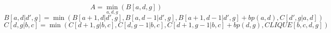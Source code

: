 \documentclass{article}
\begin{document}
$$ A =\min_{ a,d,g } \left( B\left[a,d,g\right]\right) $$
$$ B \left[a,d | d',g \right] = \min\left(B[ a+1 , d|d',g ],B[ a , d-1|d',g ],B[ a+1 , d-1|d',g ]+bp(a,d),C[ d',g | a,d ]\right)$$
$$ C \left[d,g | b,c \right] = \min\left(C[ d+1 , g|b,c ],C[ d , g-1|b,c ],C[ d+1 , g-1|b,c ]+bp(d,g),CLIQUE[ b,c,d,g ]\right)$$
\end{document}
